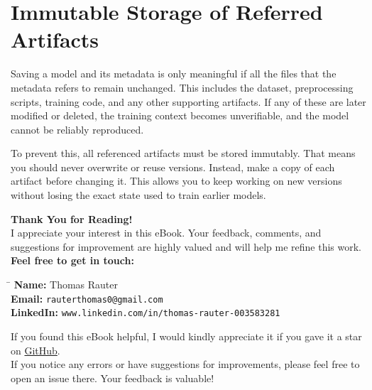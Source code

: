 \documentclass[12pt,openany]{book}
\begin{document}
\section{Immutable Storage of Referred Artifacts}

Saving a model and its metadata is only meaningful if all the files that the metadata refers to remain unchanged. This includes the dataset, preprocessing scripts, training code, and any other supporting artifacts. If any of these are later modified or deleted, the training context becomes unverifiable, and the model cannot be reliably reproduced. \newline

To prevent this, all referenced artifacts must be stored immutably. That means you should never overwrite or reuse versions. Instead, make a copy of each artifact before changing it. This allows you to keep working on new versions without losing the exact state used to train earlier models.







\newpage
\thispagestyle{empty}

\begin{center}
    \vspace*{\fill}
    \Large{\textbf{Thank You for Reading!}}\\[1cm]
    \normalsize{
        I appreciate your interest in this eBook. Your feedback, comments, and suggestions for improvement are highly valued and will help me refine this work.
    }\\[0.5cm]
    \textbf{Feel free to get in touch:}\\[0.5cm]
    \begin{tabbing}
        \hspace{3cm} \= \hspace{6cm} \kill
        \textbf{Name:} \> Thomas Rauter \\
        \textbf{Email:} \> \texttt{rauterthomas0@gmail.com} \\
        \textbf{LinkedIn:} \> \texttt{www.linkedin.com/in/thomas-rauter-003583281} \\
    \end{tabbing}
    \normalsize{
        If you found this eBook helpful, I would kindly appreciate it if you gave it a star on \href{https://github.com/Thomas-Rauter/Navigating-Machine-Learning-Projects}{GitHub}.\\
        If you notice any errors or have suggestions for improvements, please feel free to open an issue there. Your feedback is valuable!
    }
    \\[1cm]
    \vspace*{\fill}
\end{center}
\end{document}
